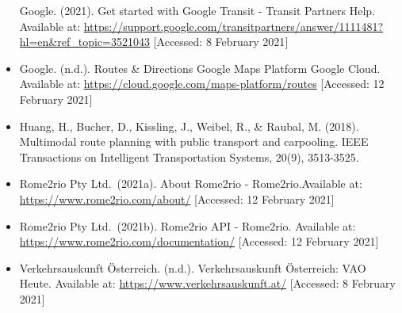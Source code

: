 \documentclass[
]{book}
\begin{document}
\begin{itemize}
  Google. (2021). Get started with Google Transit - Transit Partners Help. Available at: \url{https://support.google.com/transitpartners/answer/1111481?hl=en\&ref_topic=3521043} {[}Accessed: 8 February 2021{]}
\item
  Google. (n.d.). Routes \& Directions \textbar{} Google Maps Platform \textbar{} Google Cloud. Available at: \url{https://cloud.google.com/maps-platform/routes} {[}Accessed: 12 February 2021{]}
\item
  Huang, H., Bucher, D., Kissling, J., Weibel, R., \& Raubal, M. (2018). Multimodal route planning with public transport and carpooling. IEEE Transactions on Intelligent Transportation Systems, 20(9), 3513-3525.
\item
  Rome2rio Pty Ltd.~(2021a). About Rome2rio - Rome2rio.Available at: \url{https://www.rome2rio.com/about/} {[}Accessed: 12 February 2021{]}
\item
  Rome2rio Pty Ltd.~(2021b). Rome2rio API - Rome2rio. Available at: \url{https://www.rome2rio.com/documentation/} {[}Accessed: 12 February 2021{]}
\item
  Verkehrsauskunft Österreich. (n.d.). Verkehrsauskunft Österreich: VAO Heute. Available at: \url{https://www.verkehrsauskunft.at/} {[}Accessed: 8 February 2021{]}
\end{itemize}

  
\end{document}
